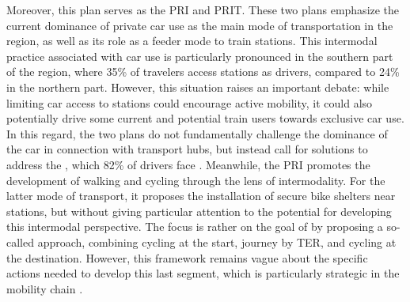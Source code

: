 \begin{refsegment}
Moreover, this plan serves as the \acrfull{PRI} and \acrfull{PRIT}. These two plans emphasize the current dominance of private car use as the main mode of transportation in the region, as well as its role as a feeder mode to train stations. This intermodal practice associated with car use is particularly pronounced in the southern part of the region, where 35\% of travelers access stations as drivers, compared to 24\% in the northern part. However, this situation raises an important debate: while limiting car access to stations could encourage active mobility, it could also potentially drive some current and potential train users towards exclusive car use. In this regard, the two plans do not fundamentally challenge the dominance of the car in connection with transport hubs, but instead call for solutions to address the , which 82\% of drivers face \textcolor{blue}{\autocite[46]{region_hauts-de-france_planification_2024}}. Meanwhile, the \acrshort{PRI} promotes the development of walking and cycling through the lens of intermodality. For the latter mode of transport, it proposes the installation of secure bike shelters near stations, but without giving particular attention to the potential for developing this intermodal perspective. The focus is rather on the goal of  by proposing a so-called  approach, combining cycling at the start, \gls{journey} by \acrshort{TER}, and cycling at the destination. However, this framework remains vague about the specific actions needed to develop this last segment, which is particularly strategic in the mobility chain \textcolor{blue}{\autocite[37]{region_hauts-de-france_planification_2024}}.%


\end{refsegment}
